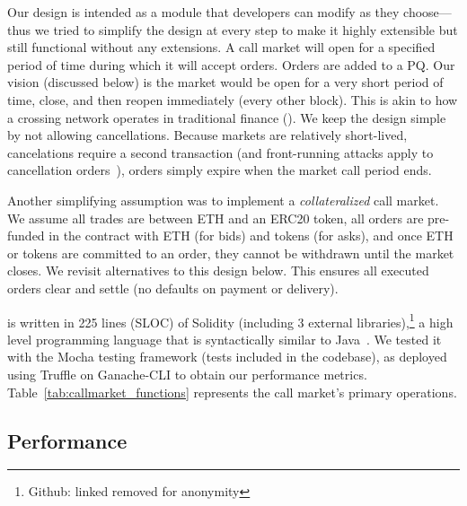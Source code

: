 
Our design \cm is intended as a module that developers can modify as they choose---thus we tried to simplify the design at every step to make it highly extensible but still functional without any extensions. A call market will open for a specified period of time during which it will accept orders. Orders are added to a PQ. Our vision (discussed below) is the market would be open for a very short period of time, close, and then reopen immediately (\eg every other block). This is akin to how a crossing network operates in traditional finance (\ie {}). We keep the design simple by not allowing cancellations. Because markets are relatively short-lived, cancelations require a second transaction (and front-running attacks apply to cancellation orders~\cite{eskandari2019sok}), orders simply expire when the market call period ends. 

Another simplifying assumption was to implement a \textit{collateralized} call market. We assume all trades are between ETH and an ERC20 token, all orders are pre-funded in the contract with ETH (for bids) and tokens (for asks), and once ETH or tokens are committed to an order, they cannot be withdrawn until the market closes. We revisit alternatives to this design below. This ensures all executed orders clear and settle (\ie no defaults on payment or delivery). 


\cm is written in 225 lines (SLOC) of Solidity (including 3 external libraries),\footnote{Github: linked removed for anonymity} a high level programming language that is syntactically similar to Java~\cite{Ethereum41:online}. We tested it with the Mocha testing framework (tests included in the codebase), as deployed using Truffle on Ganache-CLI to obtain our performance metrics. Table~\ref{tab:callmarket_functions} represents the call market's primary operations.


 \subsection{Performance}
 
 
 
